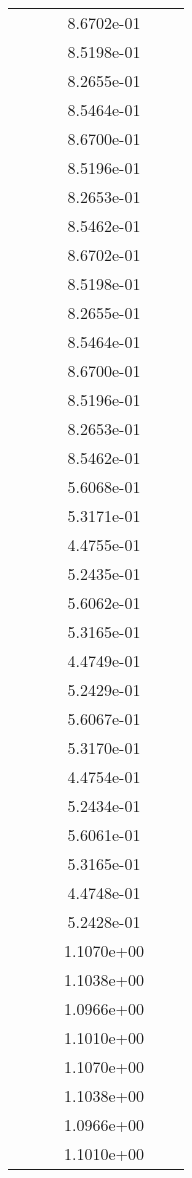 \begin{xltabular}{\textwidth}{r|rS[table-format=1.3e+2]S[table-format=1.4e+2]S[table-format=1.4e+2]S[table-format=-1.5]}
&  &  & 8.6702e-01 & & \\
&  &  & 8.5198e-01 & & \\
&  &  & 8.2655e-01 & & \\
&  &  & 8.5464e-01 & & \\
&  &  & 8.6700e-01 & & \\
&  &  & 8.5196e-01 & & \\
&  &  & 8.2653e-01 & & \\
&  &  & 8.5462e-01 & & \\
&  &  & 8.6702e-01 & & \\
&  &  & 8.5198e-01 & & \\
&  &  & 8.2655e-01 & & \\
&  &  & 8.5464e-01 & & \\
&  &  & 8.6700e-01 & & \\
&  &  & 8.5196e-01 & & \\
&  &  & 8.2653e-01 & & \\
&  &  & 8.5462e-01 & & \\
&  &  & 5.6068e-01 & & \\
&  &  & 5.3171e-01 & & \\
&  &  & 4.4755e-01 & & \\
&  &  & 5.2435e-01 & & \\
&  &  & 5.6062e-01 & & \\
&  &  & 5.3165e-01 & & \\
&  &  & 4.4749e-01 & & \\
&  &  & 5.2429e-01 & & \\
&  &  & 5.6067e-01 & & \\
&  &  & 5.3170e-01 & & \\
&  &  & 4.4754e-01 & & \\
&  &  & 5.2434e-01 & & \\
&  &  & 5.6061e-01 & & \\
&  &  & 5.3165e-01 & & \\
&  &  & 4.4748e-01 & & \\
&  &  & 5.2428e-01 & & \\
&  &  & 1.1070e+00 & & \\
&  &  & 1.1038e+00 & & \\
&  &  & 1.0966e+00 & & \\
&  &  & 1.1010e+00 & & \\
&  &  & 1.1070e+00 & & \\
&  &  & 1.1038e+00 & & \\
&  &  & 1.0966e+00 & & \\
&  &  & 1.1010e+00 & & \\

\end{xltabular}
